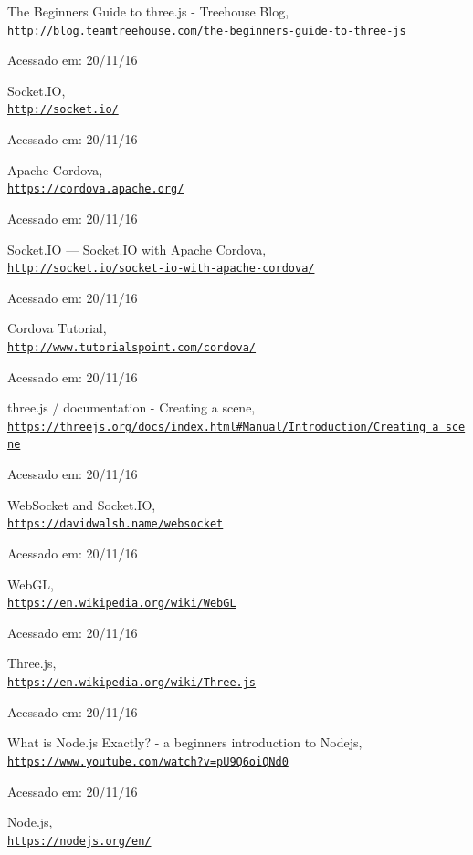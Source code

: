 \documentclass[a4paper,12pt]{article}
\begin{document}
\begin{thebibliography}{50}
The Beginners Guide to three.js - Treehouse Blog,
\\\texttt{\url{http://blog.teamtreehouse.com/the-beginners-guide-to-three-js}}

Acessado em: 20/11/16


Socket.IO,
\\\texttt{\url{http://socket.io/}}

Acessado em: 20/11/16


Apache Cordova,
\\\texttt{\url{https://cordova.apache.org/}}

Acessado em: 20/11/16


Socket.IO  —  Socket.IO with Apache Cordova,
\\\texttt{\url{http://socket.io/socket-io-with-apache-cordova/}}

Acessado em: 20/11/16


Cordova Tutorial,
\\\texttt{\url{http://www.tutorialspoint.com/cordova/}}

Acessado em: 20/11/16


three.js / documentation - Creating a scene,
\\\texttt{\url{https://threejs.org/docs/index.html\#Manual/Introduction/Creating_a_scene}}

Acessado em: 20/11/16


WebSocket and Socket.IO,
\\\texttt{\url{https://davidwalsh.name/websocket}}

Acessado em: 20/11/16


WebGL,
\\\texttt{\url{https://en.wikipedia.org/wiki/WebGL}}

Acessado em: 20/11/16


Three.js,
\\\texttt{\url{https://en.wikipedia.org/wiki/Three.js}}

Acessado em: 20/11/16


What is Node.js Exactly? - a beginners introduction to Nodejs,
\\\texttt{\url{https://www.youtube.com/watch?v=pU9Q6oiQNd0}}

Acessado em: 20/11/16


Node.js,
\\\texttt{\url{https://nodejs.org/en/}}


\end{thebibliography}
\end{document}
